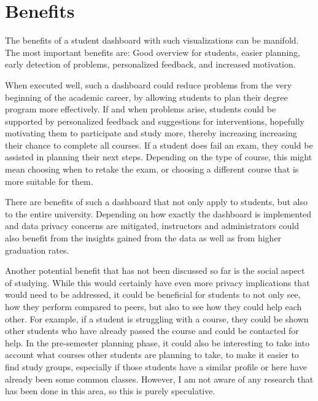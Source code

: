 \section{Benefits}
\label{sec:benefits}

The benefits of a student dashboard with such visualizations can be manifold.
The most important benefits are: Good overview for students, easier planning, early detection of problems, personalized feedback, and increased motivation.

When executed well, such a dashboard could reduce problems from the very beginning of the academic career, by allowing students to plan their degree program more effectively.
If and when problems arise, students could be supported by personalized feedback and suggestions for interventions, hopefully motivating them to participate and study more, thereby increasing increasing their chance to complete all courses. If a student does fail an exam, they could be assisted in planning their next steps. Depending on the type of course, this might mean choosing when to retake the exam, or choosing a different course that is more suitable for them.

There are benefits of such a dashboard that not only apply to students, but also to the entire university. Depending on how exactly the dashboard is implemented and data privacy concerns are mitigated, instructors and administrators could also benefit from the insights gained from the data as well as from higher graduation rates.

Another potential benefit that has not been discussed so far is the social aspect of studying. While this would certainly have even more privacy implications that would need to be addressed, it could be beneficial for students to not only see, how they perform compared to peers, but also to see how they could help each other.
For example, if a student is struggling with a course, they could be shown other students who have already passed the course and could be contacted for help.
In the pre-semester planning phase, it could also be interesting to take into account what courses other students are planning to take, to make it easier to find study groups, especially if those students have a similar profile or here have already been some common classes.
However, I am not aware of any research that has been done in this area, so this is purely speculative.
